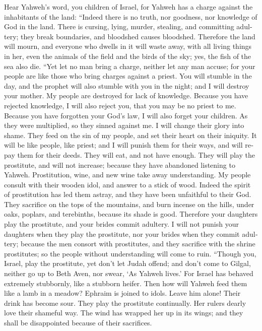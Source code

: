 \begin{paracol}{2}
\begin{otherlanguage}{english}
 Hear Yahweh's word, you children of Israel, for Yahweh
has a charge against the inhabitants of the land: ``Indeed there is no
truth, nor goodness, nor knowledge of God in the land. 
There is cursing, lying, murder, stealing, and committing adultery; they
break boundaries, and bloodshed causes bloodshed. 
Therefore the land will mourn, and everyone who dwells in it will waste
away, with all living things in her, even the animals of the field and
the birds of the sky; yes, the fish of the sea also die. 
``Yet let no man bring a charge, neither let any man accuse; for your
people are like those who bring charges against a priest. 
You will stumble in the day, and the prophet will also stumble with you
in the night; and I will destroy your mother.  My people
are destroyed for lack of knowledge. Because you have rejected
knowledge, I will also reject you, that you may be no priest to me.
Because you have forgotten your God's law, I will also forget your
children.  As they were multiplied, so they sinned against
me. I will change their glory into shame.  They feed on
the sin of my people, and set their heart on their iniquity.
 It will be like people, like priest; and I will punish
them for their ways, and will repay them for their deeds.
 They will eat, and not have enough. They will play the
prostitute, and will not increase; because they have abandoned listening
to Yahweh.  Prostitution, wine, and new wine take away
understanding.  My people consult with their wooden idol,
and answer to a stick of wood. Indeed the spirit of prostitution has led
them astray, and they have been unfaithful to their God. 
They sacrifice on the tops of the mountains, and burn incense on the
hills, under oaks, poplars, and terebinths, because its shade is good.
Therefore your daughters play the prostitute, and your brides commit
adultery.  I will not punish your daughters when they
play the prostitute, nor your brides when they commit adultery; because
the men consort with prostitutes, and they sacrifice with the shrine
prostitutes; so the people without understanding will come to ruin.
 ``Though you, Israel, play the prostitute, yet don't let
Judah offend; and don't come to Gilgal, neither go up to Beth Aven, nor
swear, `As Yahweh lives.'  For Israel has behaved
extremely stubbornly, like a stubborn heifer. Then how will Yahweh feed
them like a lamb in a meadow?  Ephraim is joined to
idols. Leave him alone!  Their drink has become sour.
They play the prostitute continually. Her rulers dearly love their
shameful way.  The wind has wrapped her up in its wings;
and they shall be disappointed because of their sacrifices.


\end{otherlanguage}
\end{paracol}
